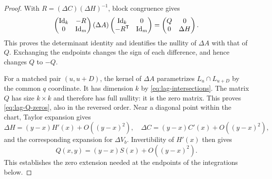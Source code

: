 \begin{proof}
With $R=(\Delta C)(\Delta H)^{-1}$, block congruence gives
\begin{equation}
 \begin{pmatrix}\mathrm{Id}_k&-R\\0&\mathrm{Id}_m\end{pmatrix}
 (\Delta A)
 \begin{pmatrix}\mathrm{Id}_k&0\\-R^{\mathsf T}&\mathrm{Id}_m\end{pmatrix}
 =\begin{pmatrix}Q&0\\0&\Delta H\end{pmatrix}.
 \label{eq:lag-block-congruence}
\end{equation}
This proves the determinant identity and identifies the nullity of
$\Delta A$ with that of $Q$.  Exchanging the endpoints changes the
sign of each difference, and hence changes $Q$ to $-Q$.

For a matched pair $(u,u+D)$, the kernel of $\Delta A$ parametrizes
$L_u\cap L_{u+D}$ by the common $q$ coordinate.  It has dimension $k$
by \eqref{eq:lag-intersections}.  The matrix $Q$ has size $k\times k$
and therefore has full nullity: it is the zero matrix.  This proves
\eqref{eq:lag-Q-zeros}, also in the reversed order.  Near a diagonal
point within the chart, Taylor expansion gives
\[
 \Delta H=(y-x)H'(x)+O((y-x)^2),\quad
 \Delta C=(y-x)C'(x)+O((y-x)^2),
\]
and the corresponding expansion for $\Delta V_b$.  Invertibility of
$H'(x)$ then gives
\begin{equation}
 Q(x,y)=(y-x)S(x)+O((y-x)^2).
 \label{eq:lag-Q-diagonal}
\end{equation}
This establishes the zero extension needed at the endpoints of the
integrations below.


\end{proof}
